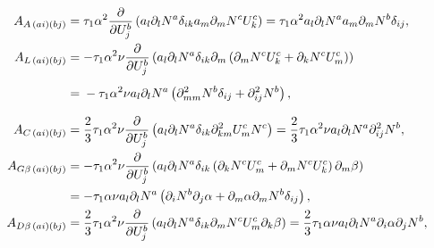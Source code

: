 \begingroup\footnotesize
\begin{align}
  A_{A\, (ai)(bj)}        & = \tau_1 \alpha^2 \frac{\partial }{\partial U_j^b} \left( a_l \partial_l N^a \delta_{ik} a_m \partial_m N^c U_k^c \right) = \tau_1 \alpha^2 a_l \partial_l N^a a_m \partial_m N^b \delta_{ij}, \label{eq:AALHSStabilizationTerm}                                                                              \\
  A_{L\, (ai)(bj)}        & = - \tau_1 \alpha^2 \nu \frac{\partial }{\partial U_j^b} \left( a_l \partial_l N^a \delta_{ik} \partial_m \left(\partial_m N^c U_k^c + \partial_k N^c U_m^c \right) \right) \notag                                                                                                                            \\
                          & =\vphantom{\frac{\partial }{\partial U_j^b}} - \tau_1 \alpha^2 \nu a_l \partial_l N^a \left( \partial^2_{mm}N^b \delta_{ij} + \partial^2_{ij} N^b \right), \label{eq:ALLHSStabilizationTerm}                                                                                                                  \\
  A_{C\, (ai)(bj)}        & = \frac{2}{3} \tau_1 \alpha^2 \nu \frac{\partial }{\partial U_j^b} \left( a_l \partial_l N^a \delta_{ik} \partial^2_{km} U_m^c N^c\right) = \frac{2}{3} \tau_1 \alpha^2 \nu a_l \partial_l N^a \partial^2_{ij} N^b, \label{eq:ACLHSStabilizationTerm}                                                         \\
  A_{G \beta \, (ai)(bj)} & = -\tau_1 \alpha^2 \nu \frac{\partial }{\partial U_j^b} \left( a_l \partial_l N^a \delta_{ik} \left( \partial_k N^c U_m^c + \partial_m N^c U_k^c \right) \partial_m \beta \right) \notag                                                                                                                   \\
                          & = -\tau_1 \alpha \nu a_l \partial_l N^a \left( \partial_i N^b \partial_j \alpha + \partial_m \alpha \partial_m N^b \delta_{ij} \right), \label{eq:AGBetaLHSStabilizationTerm}                                                                                                                                 \\
  A_{D \beta \, (ai)(bj)} & = \frac{2}{3} \tau_1 \alpha^2 \nu \frac{\partial }{\partial U_j^b} \left( a_l \partial_l N^a \delta_{ik} \partial_m N^c U_m^c \partial_k \beta \right) = \frac{2}{3} \tau_1 \alpha \nu a_l \partial_l N^a \partial_i \alpha \partial_j N^b, \label{eq:ADBetaLHSStabilizationTerm}                             \\

\end{align}
